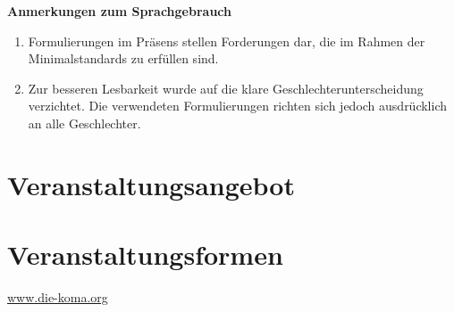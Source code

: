 \documentclass[10pt,twoside,a5paper,openright]{scrbook}
\begin{document}
  
  

  \newpage
  \tableofcontents

  \textbf{Anmerkungen zum Sprachgebrauch}
  \begin{enumerate}
    \item Formulierungen im Präsens stellen Forderungen dar, die im Rahmen der Minimalstandards zu erfüllen sind.
    \item Zur besseren Lesbarkeit wurde auf die klare Geschlechterunterscheidung verzichtet. Die verwendeten Formulierungen richten sich jedoch ausdrücklich an alle Geschlechter.
  \end{enumerate}

  \clearpage
  

  \mainmatter

  \chapter{Veranstaltungsangebot}
  

  \chapter{Veranstaltungsformen}
  

  \clearpage
  \thispagestyle{empty}

  \clearpage
  \thispagestyle{empty}
  \vfill
  \begin{center}
    \url{www.die-koma.org}
  \end{center}
\end{document}
